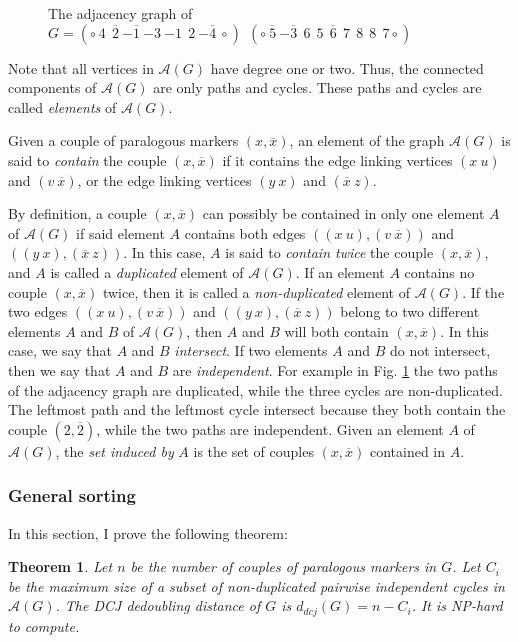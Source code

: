 \documentclass[11pt,final,twoside,nofrench]{thlifl}
\newcommand{\fst}[1]{ \ensuremath{#1} }
\newcommand{\snd}[1]{ \ensuremath{\overline{#1}} }
\newcommand{\msnd}[1]{ \ensuremath{{-\overline{#1}}} }
\newcommand\aff[2]{\ensuremath{(\fst{#1}~\fst{#2})}}
\newcommand\asf[2]{\ensuremath{(\snd{#1}~\fst{#2})}}
\newcommand\afs[2]{\ensuremath{(\fst{#1}~\snd{#2})}}
\newtheorem{theorem}{Theorem}
\begin{document}
\begin{figure}[htbp]
\begin{tikzpicture}[xscale=0.3,yscale=0.3]
\end{tikzpicture}

\caption{The adjacency graph of $G=(\circ ~ 4~~\snd{2}~\msnd{1}~{-3}~{-1}~~2~\msnd{4}~ {\circ})~~ (\circ ~\snd{5}~\msnd{3}~~6~~5~~\snd{6}~~7~~8~~8~~7 {\circ})$}
\label{fig:adjacency}
\end{figure}

Note that all vertices in  $\mathcal{A}(G)$ have degree one or two.
Thus, the connected components of  $\mathcal{A}(G)$ are only paths 
and cycles. These paths and cycles are called \emph{elements} of 
$\mathcal{A}(G)$.

Given a couple of paralogous markers $(x,\snd{x})$, an element
of the graph $\mathcal{A}(G)$  is said to \emph{contain} the couple 
$(x,\snd{x})$ if it contains the edge linking vertices $\aff{x}{u}$ and  
$\afs{v}{x}$, or the edge linking vertices  $\aff{y}{x}$ and  $\asf{x}{z}$.

By definition,  a couple $(x,\snd{x})$ can possibly be contained in only one
element $A$ of $\mathcal{A}(G)$ if said element $A$ contains both edges  
$(\aff{x}{u},\afs{v}{x})$ and  $(\aff{y}{x},\asf{x}{z})$. In this case,
$A$ is said to \emph{contain twice} the couple $(x,\snd{x})$, and 
$A$ is called a \emph{duplicated} element of $\mathcal{A}(G)$. If an element 
$A$ contains no couple  $(x,\snd{x})$ twice, then it is called a 
\emph{non-duplicated} element of $\mathcal{A}(G)$.
If the two edges $(\aff{x}{u},\afs{v}{x})$ and  $(\aff{y}{x},\asf{x}{z})$
belong to two different elements $A$ and $B$ of $\mathcal{A}(G)$, then  
$A$ and $B$ will both contain $(x,\snd{x})$. In this case, we say that
$A$ and $B$ \emph{intersect}. If two elements $A$ and $B$ do not intersect, then we say that $A$ and $B$ are \emph{independent}.
For example in Fig. \ref{fig:adjacency} the two paths of the adjacency 
graph are duplicated, while the three cycles are non-duplicated. The leftmost
path and the leftmost cycle intersect because they both contain the couple 
$(2,\snd{2})$, while the two paths are independent.
 Given an element $A$ of $\mathcal{A}(G)$, the \emph{set induced by} $A$ 
is the set of couples $(x,\snd{x})$ contained in $A$.

\subsubsection{General sorting}

In this section, I prove the following theorem:

\begin{theorem}
\label{thm:general-dcj}
Let $n$ be the number of couples of paralogous markers in $G$. Let
$C_{i}$ be the maximum size of a subset of non-duplicated pairwise 
independent cycles in $\mathcal{A}(G)$.
The DCJ dedoubling distance of $G$ is $d_{dcj}(G) = n-C_{i}$. It is NP-hard to compute.
\end{theorem}
\end{document}
